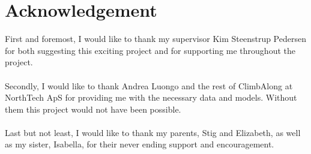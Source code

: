 \documentclass[./main.tex]{subfiles}
\begin{document}
\section*{Acknowledgement}
First and foremost, I would like to thank my supervisor Kim Steenstrup Pedersen for both suggesting this exciting project and for supporting me throughout the project.
\\
\\
Secondly, I would like to thank Andrea Luongo and the rest of ClimbAlong at NorthTech ApS for providing me with the necessary data and models. Without them this project would not have been possible.
\\
\\
Last but not least, I would like to thank my parents, Stig and Elizabeth, as well as my sister, Isabella, for their never ending support and encouragement.
\end{document}
